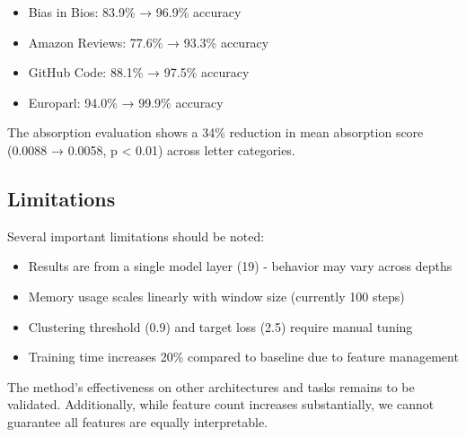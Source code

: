 \documentclass{article} %
\begin{document}
\begin{itemize}
    \item Bias in Bios: 83.9\% → 96.9\% accuracy
    \item Amazon Reviews: 77.6\% → 93.3\% accuracy  
    \item GitHub Code: 88.1\% → 97.5\% accuracy
    \item Europarl: 94.0\% → 99.9\% accuracy
\end{itemize}

The absorption evaluation shows a 34\% reduction in mean absorption score (0.0088 → 0.0058, p < 0.01) across letter categories.

\subsection{Limitations}
Several important limitations should be noted:

\begin{itemize}
    \item Results are from a single model layer (19) - behavior may vary across depths
    \item Memory usage scales linearly with window size (currently 100 steps)
    \item Clustering threshold (0.9) and target loss (2.5) require manual tuning
    \item Training time increases 20\% compared to baseline due to feature management
\end{itemize}

The method's effectiveness on other architectures and tasks remains to be validated. Additionally, while feature count increases substantially, we cannot guarantee all features are equally interpretable.
\end{document}
